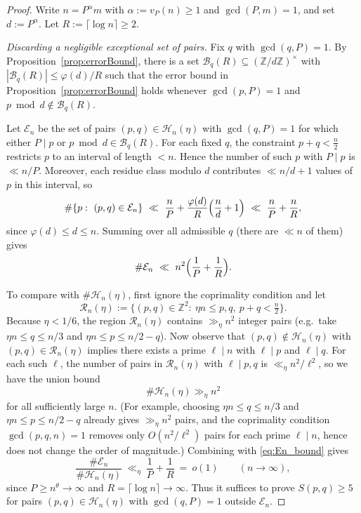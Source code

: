 \documentclass[12pt]{amsart}
\begin{document}
\begin{proof}
Write $n=P^{\alpha}m$ with $\alpha:=v_P(n)\ge 1$ and $\gcd(P,m)=1$, and set $d:=P^{\alpha}$.
Let $R:=\lceil \log n\rceil\ge 2$.

\smallskip\noindent
\emph{Discarding a negligible exceptional set of pairs.}
Fix $q$ with $\gcd(q,P)=1$. By Proposition~\ref{prop:errorBound}, there is a set
$\mathcal B_q(R)\subseteq (\mathbb Z/d\mathbb Z)^\times$ with $|\mathcal B_q(R)|\le \varphi(d)/R$
such that the error bound in Proposition~\ref{prop:errorBound} holds whenever $\gcd(p,P)=1$ and
$p\bmod d\notin \mathcal B_q(R)$.

Let $\mathcal E_n$ be the set of pairs $(p,q)\in\mathcal H_n(\eta)$ with $\gcd(q,P)=1$ for which either
$P\mid p$ or $p\bmod d\in \mathcal B_q(R)$.
For each fixed $q$, the constraint $p+q<\tfrac{n}{2}$ restricts $p$ to an interval of length $<n$.
Hence the number of such $p$ with $P\mid p$ is $\ll n/P$.
Moreover, each residue class modulo $d$ contributes $\ll n/d+1$ values of $p$ in this interval, so
\[
\#\{p:\ (p,q)\in\mathcal E_n\}\ \ll\ \frac{n}{P}+\frac{\varphi(d)}{R}\Bigl(\frac{n}{d}+1\Bigr)
\ \ll\ \frac{n}{P}+\frac{n}{R},
\]
since $\varphi(d)\le d\le n$.
Summing over all admissible $q$ (there are $\ll n$ of them) gives
\begin{equation}\label{eq:En_bound}
\#\mathcal E_n\ \ll\ n^2\Bigl(\frac{1}{P}+\frac{1}{R}\Bigr).
\end{equation}

To compare with $\#\mathcal H_n(\eta)$, first ignore the coprimality condition and let
\[
\mathcal R_n(\eta):=\{(p,q)\in\mathbb Z^2:\ \eta n\le p,q,\ p+q<\tfrac{n}{2}\}.
\]
Because $\eta<1/6$, the region $\mathcal R_n(\eta)$ contains $\gg_{\eta} n^2$ integer pairs (e.g.\ take
$\eta n\le q\le n/3$ and $\eta n\le p\le n/2-q$).
Now observe that $(p,q)\notin \mathcal H_n(\eta)$ with $(p,q)\in\mathcal R_n(\eta)$ implies
there exists a prime $\ell\mid n$ with $\ell\mid p$ and $\ell\mid q$.
For each such $\ell$, the number of pairs in $\mathcal R_n(\eta)$ with $\ell\mid p,q$ is
$\ll_{\eta} n^2/\ell^2$, so we have the union bound
$$\#\mathcal H_n(\eta)\gg_\eta n^2$$
 for all sufficiently large $n$.
(For example, choosing $\eta n\le q\le n/3$ and $\eta n\le p\le n/2-q$ already gives $\gg_\eta n^2$ pairs,
and the coprimality condition $\gcd(p,q,n)=1$ removes only $O(n^2/\ell^2)$ pairs for each prime $\ell\mid n$,
hence does not change the order of magnitude.)
%
%
Combining with \eqref{eq:En_bound} gives
\[
\frac{\#\mathcal E_n}{\#\mathcal H_n(\eta)}\ \ll_{\eta}\ \frac{1}{P}+\frac{1}{R}
\ =\ o(1)
\qquad (n\to\infty),
\]
since $P\ge n^\theta\to\infty$ and $R=\lceil\log n\rceil\to\infty$.
Thus it suffices to prove $S(p,q)\ge 5$ for pairs $(p,q)\in\mathcal H_n(\eta)$ with $\gcd(q,P)=1$
outside $\mathcal E_n$.


\end{proof}
\end{document}
